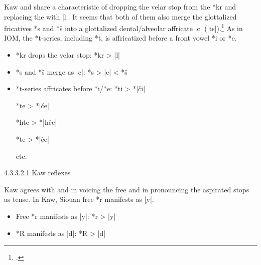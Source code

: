 \documentclass[output=paper]{LSP/langsci}
\begin{document}

Kaw and  share a characteristic of dropping the velar stop from the *kr  and replacing the  with |l|.  It seems that both of them also merge the glottalized fricatives *s\textsuperscript{} and *š\textsuperscript{} into a glottalized dental/alveolar affricate |c\textsuperscript{}| (|ts\textsuperscript{}|).\footnote{\citealt[856]{Rankinetal2006PDF}.} As in IOM, the *t-series, including *t\textsuperscript{}, is affricatized before a front vowel *i or *e.  

\begin{itemize}
\item *kr drops the velar stop: \hspace{3em} *kr	>	|l|
\item *s\textsuperscript{} and *š\textsuperscript{} merge as |c\textsuperscript{}|: \hspace{3em} *s\textsuperscript{}	>	|c\textsuperscript{}|	<	*š\textsuperscript{}

\item *t-series affricates before *i/*e: \hspace{1em} *ti	>	*|\v{c}i|

\hspace{14em} *te	>	*|\v{c}e|

\hspace{14em} *hte	>	*|h\v{c}e|

\hspace{14em} *t\textsuperscript{}e	>	*|\v{c}\textsuperscript{}e|

\hspace{14em} etc.
\end{itemize}

4.3.3.2.1  Kaw reflexes
\vspace{1em}

Kaw agrees with  and  in voicing the free  and in pronouncing the aspirated stops as tense.  In Kaw, Siouan free *r manifests as |y|.

\begin{itemize}
\item Free *r manifests as |y|: \hspace{1em} *r	>	|y|
\item *R manifests as |d|: \hspace{3em} *R	>	|d|
\end{itemize}
\end{document}
